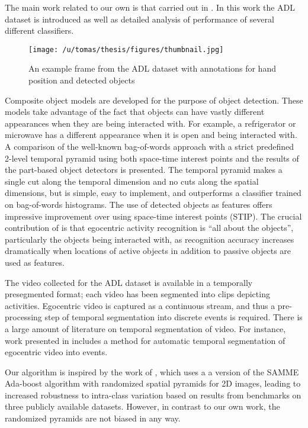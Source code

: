 \documentclass{bmvc2k}
\begin{document}
	The main work related to our own is that carried out in \cite{Ramanan12}. 
	In this work the ADL dataset is introduced as well as detailed analysis of
	performance of several different classifiers. 
	\begin{figure}[t]
		\begin{center}
			  \texttt{[image: /u/tomas/thesis/figures/thumbnail.jpg]}
		\end{center}
    \caption{An example frame from the ADL dataset with annotations for hand
    position and detected objects} 
				\label{fig:long}
				\label{fig:onecol}
	\end{figure}
  Composite object models are developed for the purpose of object detection. 
  These models take advantage of the fact that objects can have vastly
  different appearances when they are being interacted with. For example, a
  refrigerator or microwave has a different appearance when it is open and
  being interacted with. 
  A comparison of the well-known bag-of-words approach with a strict
  predefined
  2-level temporal pyramid using both space-time interest points and the
  results of the part-based object detectors is presented. The temporal pyramid makes 
  a single cut along the temporal dimension and no cuts along the
  spatial dimensions, but is simple, easy to implement, and outperforms a 
  classifier trained on bag-of-words histograms. The use of detected objects as
  features offers impressive improvement over using space-time interest points
  (STIP).
	The crucial contribution of
	\cite{Ramanan12} is that egocentric activity recognition is ``all about
	the objects'', particularly the objects being interacted with, as
	recognition accuracy increases dramatically when locations of active
  objects in addition to passive objects are used as features. 

	The video collected for the ADL dataset is available in a temporally
	presegmented format; each video has been segmented into clips depicting
	activities. Egocentric video is captured as a continuous stream, and thus
  a pre-processing step of temporal segmentation into discrete events is
  required. There is a large amount of literature on temporal segmentation
  of video. For instance, work presented in \cite{Lee12} includes a method for
	automatic temporal segmentation of egocentric video into events.
  
	Our algorithm is inspired by the work of \cite{Jiang12}, which uses a
  a version of the SAMME Ada-boost algorithm \cite{Zhu06}
  with randomized spatial pyramids for 2D images, 
	leading to increased robustness to intra-class variation based on results
  from benchmarks on three publicly available datasets. However, in contrast
  to our own work, the randomized pyramids are not biased in any way. 
	
\end{document}

